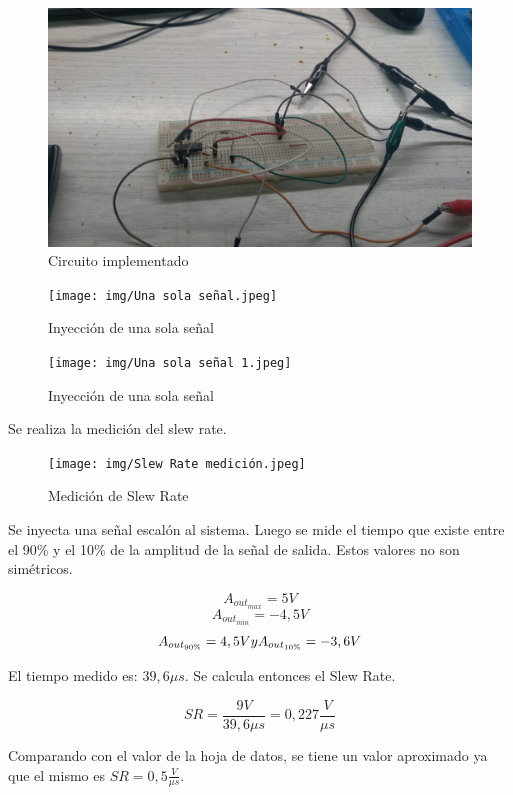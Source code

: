 \newpage

\begin{figure}[h!]
    \centering
    \includegraphics[width=0.80\linewidth]{img/Circuito implementado.jpeg}
    \caption{Circuito implementado}
    
\end{figure}
\begin{figure}[h!]
    \centering
    \texttt{[image: img/Una sola señal.jpeg]}
    \caption{Inyección de una sola señal}
    
\end{figure}

\begin{figure}[H]
    \centering
    \texttt{[image: img/Una sola señal 1.jpeg]}
    \caption{Inyección de una sola señal}
    
\end{figure}

\hspace{1mm} Se realiza la medición del slew rate.
\begin{figure}[H]
    \centering
    \texttt{[image: img/Slew Rate medición.jpeg]}
    \caption{Medición de Slew Rate}
    
\end{figure}

Se inyecta una señal escalón al sistema. Luego se mide el tiempo que existe entre el 90\% y el 10\% de la amplitud de la señal de salida. Estos valores no son simétricos.

\[A_{out_{max}}= 5V\]
\[A_{out_{min}} = -4,5V\] 
\[A_{out_{90\%}}= 4,5V \space y \space A_{out_{10\%}}= -3,6V\]

El tiempo medido es: \(39,6\mu s\). Se calcula entonces el Slew Rate.

\[SR= \frac{9V}{39,6\mu s}= 0,227\frac{V}{\mu s}\]

Comparando con el valor de la hoja de datos, se tiene un valor aproximado ya que el mismo es \(SR= 0,5 \frac{V}{\mu s}\).

